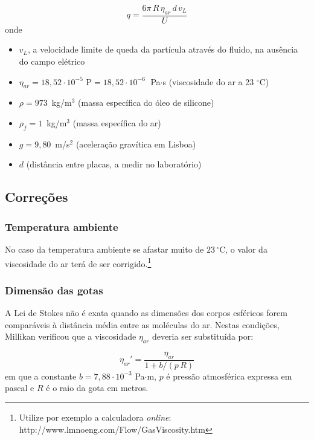 \documentclass[12pt,a4paper,oneside]{paper}
\begin{document}
\begin{equation}
	\label{eq:carga}
	q = \frac{6 \pi \, R \, \eta_{ar} \, d\, v_L}{U}  
\end{equation}
onde

\begin{itemize}
\item $v_L$, a velocidade limite de queda da partícula através do fluido, na ausência do campo elétrico
\item $\eta_{ar} = 18,52 \cdot 10^{-5}$ P$ =  18,52 \cdot 10^{-6} \;$ Pa$\cdot$s (viscosidade do ar a 23 $^{\circ}$C)
\item $\rho = 973 \,$ kg/m$^{3}$ (massa específica do óleo de silicone)
\item $\rho_f = 1 \,$ kg/m$^{3}$ (massa específica do ar)
\item $g=9,80\,$ m/s$^{2}$ (aceleração gravítica em Lisboa)
\item $d$ (distância entre placas, a medir no laboratório)
\end{itemize}

\subsection{\sf Correções}
\subsubsection{\sf Temperatura ambiente}

No caso da temperatura ambiente se afastar muito de $23\,^{\circ}\mathrm{C}$, o valor  da viscosidade do ar terá de ser
corrigido.\footnote{Utilize por exemplo a calculadora \emph{online}: http://www.lmnoeng.com/Flow/GasViscosity.htm}

\subsubsection{\sf Dimensão das gotas}

A Lei de Stokes não é exata quando as dimensões dos corpos esféricos forem comparáveis à distância média entre as moléculas
do ar. Nestas condições, Millikan verificou que a viscosidade $\eta_{ar}$ deveria ser substituída por:

\begin{equation}
	\label{eq:correcao}
	\eta_{ar}' = \frac{\eta_{ar}}{1 + b/(p\,R)}  
\end{equation}
em que a constante $b=7,88\cdot 10^{-3}$ Pa$\cdot$m, 
$p$ é pressão atmosférica expressa em pascal e $R$ é o raio da gota em metros.
\end{document}
